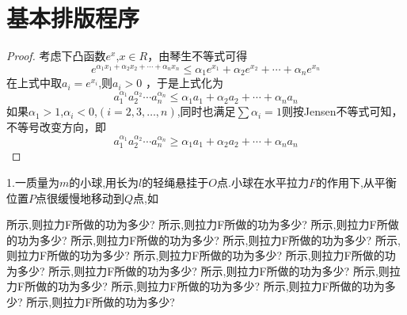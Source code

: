 \documentclass[a4paper,fontset = windows]{ctexbook}
\begin{document}
\chapter{基本排版程序}


\begin{proof}
   考虑下凸函数$e^x$,$x\in R$，由琴生不等式可得
   \[
      e^{\alpha_1x_1+\alpha_2x_2+\cdots +\alpha_nx_n}
      \leqslant
      \alpha_1e^{x_1}+\alpha_2e^{x_2}+\cdots +\alpha_ne^{x_n}
   \]
   在上式中取$a_i=e^{x_i}$,则$a_i>0$ ，于是上式化为
   \[
      a_1^{\alpha_1}a_2^{\alpha_2}\cdots a_n^{\alpha_n}
      \leqslant
      \alpha_1 a_1+\alpha_2 a_2+\cdots +\alpha_n a_n
   \]
   如果$\alpha_1>1$,$\alpha_i<0$,$(i=2,3,\dots,n)$,同时也满足$\sum \alpha_i=1$则按Jensen不等式可知，不等号改变方向，即
   \[
      a_1^{\alpha_1}a_2^{\alpha_2}\cdots a_n^{\alpha_n}
      \geqslant
      \alpha_1 a_1+\alpha_2 a_2+\cdots +\alpha_n a_n
   \]

\end{proof}


\begin{tiankong}
   1.一质量为$m$的小球,用长为$l$的轻绳悬挂于$O$点.小球在水平拉力$F$的作用下,从平衡位置$P$点很缓慢地移动到$Q$点,如
所示,则拉力F所做的功为多少?
所示,则拉力F所做的功为多少?
所示,则拉力F所做的功为多少?
所示,则拉力F所做的功为多少?
所示,则拉力F所做的功为多少?
所示,则拉力F所做的功为多少?
所示,则拉力F所做的功为多少?
所示,则拉力F所做的功为多少?
所示,则拉力F所做的功为多少?
所示,则拉力F所做的功为多少?
所示,则拉力F所做的功为多少?
所示,则拉力F所做的功为多少?
所示,则拉力F所做的功为多少?
所示,则拉力F所做的功为多少?

\end{tiankong}
\end{document}
